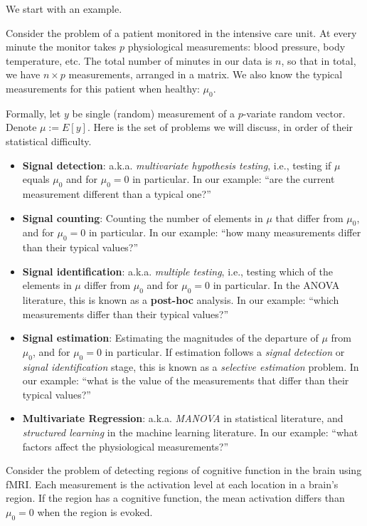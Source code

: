 \documentclass[]{book}
\theoremstyle{definition}
\theoremstyle{definition}
\theoremstyle{definition}
\theoremstyle{remark}
\let\BeginKnitrBlock\begin \let\EndKnitrBlock\end
\begin{document}
We start with an example.

\BeginKnitrBlock{example}
\protect\hypertarget{exm:icu}{}{\label{exm:icu} }Consider the problem of a
patient monitored in the intensive care unit. At every minute the
monitor takes \(p\) physiological measurements: blood pressure, body
temperature, etc. The total number of minutes in our data is \(n\), so
that in total, we have \(n \times p\) measurements, arranged in a
matrix. We also know the typical measurements for this patient when
healthy: \(\mu_0\).
\EndKnitrBlock{example}

Formally, let \(y\) be single (random) measurement of a \(p\)-variate
random vector. Denote \(\mu:=E[y]\). Here is the set of problems we will
discuss, in order of their statistical difficulty.

\begin{itemize}
\item
  \textbf{Signal detection}: a.k.a. \emph{multivariate hypothesis
  testing}, i.e., testing if \(\mu\) equals \(\mu_0\) and for
  \(\mu_0=0\) in particular. In our example: ``are the current
  measurement different than a typical one?''
\item
  \textbf{Signal counting}: Counting the number of elements in \(\mu\)
  that differ from \(\mu_0\), and for \(\mu_0=0\) in particular. In our
  example: ``how many measurements differ than their typical values?''
\item
  \textbf{Signal identification}: a.k.a. \emph{multiple testing}, i.e.,
  testing which of the elements in \(\mu\) differ from \(\mu_0\) and for
  \(\mu_0=0\) in particular. In the ANOVA literature, this is known as a
  \textbf{post-hoc} analysis. In our example: ``which measurements
  differ than their typical values?''
\item
  \textbf{Signal estimation}: Estimating the magnitudes of the departure
  of \(\mu\) from \(\mu_0\), and for \(\mu_0=0\) in particular. If
  estimation follows a \emph{signal detection} or \emph{signal
  identification} stage, this is known as a \emph{selective estimation}
  problem. In our example: ``what is the value of the measurements that
  differ than their typical values?''
\item
  \textbf{Multivariate Regression}: a.k.a. \emph{MANOVA} in statistical
  literature, and \emph{structured learning} in the machine learning
  literature. In our example: ``what factors affect the physiological
  measurements?''
\end{itemize}

\BeginKnitrBlock{example}
\protect\hypertarget{exm:brain-imaging}{}{\label{exm:brain-imaging}
}Consider the problem of detecting regions of cognitive function in the
brain using fMRI. Each measurement is the activation level at each
location in a brain's region. If the region has a cognitive function,
the mean activation differs than \(\mu_0=0\) when the region is evoked.
\EndKnitrBlock{example}
\end{document}
